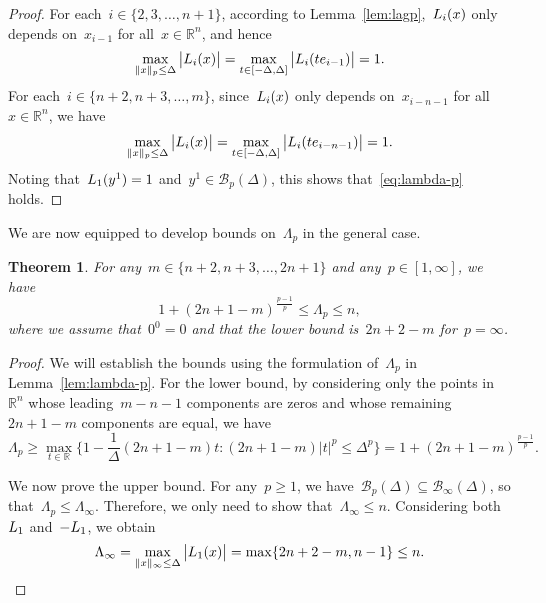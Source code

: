 \documentclass{article}
\numberwithin{equation}{section}
\theoremstyle{definition}
\theoremstyle{plain}
\newtheorem{theorem}{Theorem}[section]
\theoremstyle{remark}
\newcommand*{\abs}[2][]{#1\lvert#2#1\rvert}
\newcommand*{\lagp}[1][]{L\ifblank{#1}{}{_{#1}}}
\newcommand*{\norm}[2][]{#1\lVert#2#1\rVert}
\newcommand*{\R}{\mathbb{R}}
\newcommand*{\set}[2][]{#1\{#2#1\}}
\begin{document}
\begin{proof}
    For each~$i \in \set{2, 3, \dots, n + 1}$, according to Lemma~\ref{lem:lagp},~$\lagp[i](x)$ only depends on~$x_{i - 1}$ for all~$x \in \R^n$, and hence
    \begin{equation*}
        \max_{\norm{x}_p \le \Delta} \abs[\big]{\lagp[i](x)} = \max_{t \in [-\Delta, \Delta]} \abs[\big]{\lagp[i](t e_{i - 1})} = 1.
    \end{equation*}
    For each~$i \in \set{n + 2, n + 3, \dots, m}$, since~$\lagp[i](x)$ only depends on~$x_{i - n - 1}$ for all~$x \in \R^n$, we have
    \begin{equation*}
        \max_{\norm{x}_p \le \Delta} \abs[\big]{\lagp[i](x)} = \max_{t \in [-\Delta, \Delta]} \abs[\big]{\lagp[i](t e_{i - n - 1})} = 1.
    \end{equation*}
    Noting that~$\lagp[1](y^1) = 1$ and~$y^1 \in \mathcal{B}_p(\Delta)$, this shows that~\eqref{eq:lambda-p} holds.
\end{proof}

We are now equipped to develop bounds on~$\Lambda_p$ in the general case.

\begin{theorem}
    \label{thm:lambda-p}
    For any~$m \in \set{n + 2, n + 3, \dots, 2n + 1}$ and any~$p \in [1, \infty]$, we have
    \begin{equation*}
        1 + (2n + 1 - m)^{\frac{p - 1}{p}} \le \Lambda_p \le n,
    \end{equation*}
    where we assume that~$0^0 = 0$ and that the lower bound is~$2n + 2 - m$ for~$p = \infty$.
\end{theorem}

\begin{proof}
    We will establish the bounds using the formulation of~$\Lambda_p$ in Lemma~\ref{lem:lambda-p}.
    For the lower bound, by considering only the points in~$\R^n$ whose leading~$m - n - 1$ components are zeros and whose remaining~$2n + 1 - m$ components are equal, we have
    \begin{equation*}
        \Lambda_p \ge \max_{t \in \R} \set[\bigg]{1 - \frac{1}{\Delta} (2n + 1 - m) t : (2n + 1 - m) \abs{t}^p \le \Delta^p} = 1 + (2n + 1 - m)^{\frac{p - 1}{p}}.
    \end{equation*}

    We now prove the upper bound.
    For any~$p \ge 1$, we have~$\mathcal{B}_p(\Delta) \subseteq \mathcal{B}_{\infty}(\Delta)$, so that~$\Lambda_p \le \Lambda_{\infty}$.
    Therefore, we only need to show that~$\Lambda_{\infty} \le n$.
    Considering both~$\lagp[1]$ and~$-\lagp[1]$, we obtain
    \begin{equation*}
        \Lambda_{\infty} = \max_{\norm{x}_{\infty} \le \Delta} \abs[\big]{\lagp[1](x)} = \max \set{2n + 2 - m, n - 1} \le n.
    \end{equation*}
\end{proof}
\end{document}

